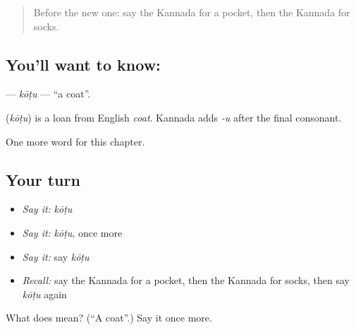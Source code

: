 \label{lesson:KA-C138-kotu}



\begin{quote}
Before the new one: say the Kannada for a pocket, then the Kannada for socks.
\end{quote}

\subsection*{You'll want to know: }
\textbf{} — \emph{kōṭu} — \textquotedblleft{}a coat\textquotedblright{}.

\begin{cousinweb}
\textbf{} (\emph{kōṭu}) is a loan from English \emph{coat}. Kannada adds \emph{-u} after the final consonant.
\end{cousinweb}

\begin{grammarlens}[title={What you've built}]
One more word for this chapter.
\end{grammarlens}

\subsection*{Your turn}
\begin{itemize}
\raggedright
  \item \emph{Say it:} \emph{kōṭu}
  \item \emph{Say it:} \emph{kōṭu}, once more
  \item \emph{Say it:} say \emph{kōṭu}
  \item \emph{Recall:} say the Kannada for a pocket, then the Kannada for socks, then say \emph{kōṭu} again
\end{itemize}

\begin{tcolorbox}[breakable,colback=teal!4,colframe=teal!35!black,title={Before you move on}]
What does  mean? (\textquotedblleft{}A coat\textquotedblright{}.) Say it once more.
\end{tcolorbox}
